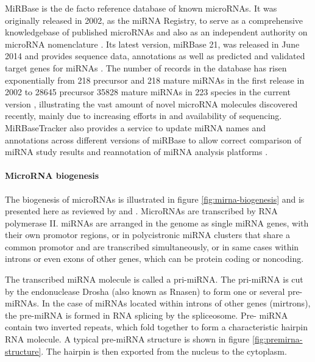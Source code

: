 MiRBase is the de facto reference database of known microRNAs. It was
originally released in 2002, as the miRNA Registry, to serve as a
comprehensive knowledgebase of published microRNAs and also as an independent
authority on microRNA nomenclature \citep{Griffiths2004}. Its latest version,
miRBase 21, was released in June 2014 \citep{MiRBaseWeb} and provides sequence
data, annotations as well as predicted and validated target genes for miRNAs
\citep{Kozomara2014}. The number of records in the database has risen
exponentially from 218 precursor and 218 mature miRNAs in the first release in
2002 to 28645 precursor 35828 mature miRNAs in 223 species in the current
version \citep{VanPeer2014,MiRBaseWeb}, illustrating the vast amount of novel
microRNA molecules discovered recently, mainly due to increasing efforts in
and availability of sequencing. MiRBaseTracker also provides a service to
update miRNA names and annotations across different versions of miRBase to
allow correct comparison of miRNA study results and reannotation of miRNA
analysis platforms \citep{VanPeer2014}.





\paragraph{MicroRNA biogenesis}\label{microrna-biogenesis}

The biogenesis of microRNAs is illustrated in figure
\ref{fig:mirna-biogenesis} and is presented here as reviewed by  
\citet{Bartel2004} and \citet{Denzler2015}. MicroRNAs are
transcribed by RNA polymerase II. miRNAs are arranged in the genome as
single miRNA genes, with their own promotor regions,
or in polycistronic miRNA clusters that share a common promotor and are
transcribed simultaneously, or in same cases within introns or even exons of
other genes, which can be protein coding or noncoding.

The transcribed miRNA molecule is called a pri-miRNA. The pri-miRNA is cut by
the endonuclease Drosha (also known as Rnasen) to form one or several pre-
miRNAs. In the case of miRNAs located within introns of other genes
(mirtrons), the pre-miRNA is formed in RNA splicing by the spliceosome. Pre-
miRNA contain two inverted repeats, which fold together to form a
characteristic hairpin RNA molecule. A typical pre-miRNA structure is shown in
figure \ref{fig:premirna-structure}. The hairpin is then exported from the
nucleus to the cytoplasm.

